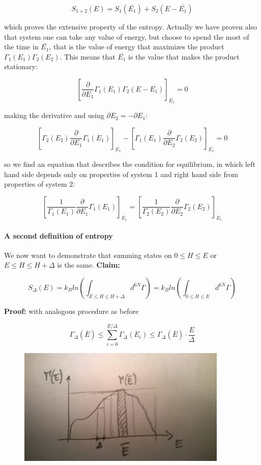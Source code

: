 \documentclass[a4paper, italian, openany]{book}
\begin{document}
$$S_{1+2}(E) = S_1(\bar{E_1}) + S_2(E- \bar{E_1})$$

which proves the extensive property of the entropy. Actually we have proven also that system one can take any value of energy, but choose to spend the most of the time in $\bar{E_1}$, that is the value of energy that maximizes the product $\Gamma_1(E_1)\Gamma_2(E_2)$.\newline
This means that $\bar{E_1}$ is the value that makes the product stationary:

$$\left [ \frac{\partial}{\partial E_1} \Gamma_1(E_1)\Gamma_2(E-E_1) \right ]_{\bar{E_1}}= 0$$

making the derivative and using $\partial E_2 = - \partial E_1$:

$$\left [ \Gamma_2(E_2) \frac{\partial}{\partial E_1} \Gamma_1(E_1) \right ]_{\bar{E_1}} - \left [ \Gamma_1 (E_1) \frac{\partial}{\partial E_2} \Gamma_2(E_2) \right ]_{\bar{E_1}} = 0$$

so we find an equation that describes the condition for equilibrium, in which left hand side depends only on properties of system 1 and right hand side from properties of system 2:

$$\left [ \frac{1}{\Gamma_1(E_1)} \frac{\partial}{\partial E_1} \Gamma_1(E_1) \right ]_{\bar{E_1}} = \left [ \frac{1}{\Gamma_2 (E_2)} \frac{\partial}{\partial E_2} \Gamma_2(E_2) \right ]_{\bar{E_1}}$$

\paragraph{A second definition of entropy}

We now want to demonstrate that summing states on $0 \le H \le E$ or $E \le H \le H + \Delta$ is the same.\newline
\textbf{Claim:}

$$S_{\Delta}(E) = k_B ln (\int_{E \le H \le H + \Delta} d^{6N} \Gamma) =k_B ln (\int_{0 \le H \le E} d^{6N} \Gamma)$$

\textbf{Proof:} with analogous procedure as before

$$\Gamma_{\Delta}(\bar{E}) \le \sum_{i=0}^{E/\Delta} \Gamma_{\Delta}(E_i) \le \Gamma_{\Delta}(\bar{E}) \cdot \frac{E}{\Delta}$$

\begin{figure}[H]
\centering
\includegraphics[width=100mm]{img/figure6.jpg}
\end{figure}
\end{document}
